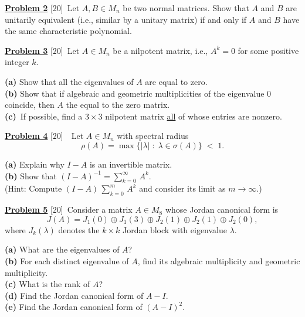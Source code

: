 \documentclass [11pt]{article}
\begin{document}
\newpage

\underline{\bf Problem 2} [20]\ 
 Let $A, B\in M_n$ be two normal matrices. Show that $A$ and $B$ are
 unitarily equivalent (i.e., similar by a unitary matrix) if and only if 
 $A$ and $B$ have the same characteristic polynomial.

\newpage

\underline{\bf Problem 3} [20]\
Let $A\in M_n$ be a nilpotent matrix, i.e., $A^k=0$ for some positive integer $k$.

{\bf (a)} Show that all the eigenvalues of $A$ are equal to zero.
\vspace{2.5in}\\
{\bf (b)} Show that if  algebraic and geometric multiplicities of the eigenvalue $0$ coincide, 
then $A$ the equal to the zero matrix.
\vspace{2.5in}\\
{\bf (c)}\ If possible, find a $3\times 3$ nilpotent matrix \underline{all} of whose entries are nonzero.


\newpage

\underline{\bf Problem 4} [20]\
\ Let $A\in M_n$ with spectral radius
$$\rho(A)=\max\{|\lambda|\;:\;\lambda\in\sigma(A)\}\;<\; 1.$$ 

{\bf (a)} Explain why $I-A$ is an invertible matrix.
\vspace{3in}\\
{\bf (b)} Show that $\displaystyle{(I-A)^{-1}=\sum_{k=0}^{\infty}\, A^k}$.\\
(Hint: Compute $\displaystyle{(I-A)\,\sum_{k=0}^{m}\, A^k}$ and consider
its limit as $m\rightarrow\infty$.)
 

\newpage

\underline{\bf Problem 5} [20]\
Consider a matrix $A\in M_8$ whose Jordan canonical form is 
$$J(A)=J_1(0)\oplus J_1(3)\oplus J_2(1)\oplus J_2(1)\oplus J_2(0),$$
where $J_k(\lambda)$ denotes the $k\times k$ Jordan block with eigenvalue $\lambda$.

{\bf (a)} What are the eigenvalues of $A$?
\vspace{.5in}\\
{\bf (b)} For each distinct eigenvalue of $A$, find its algebraic multiplicity and geometric multiplicity. 
\vspace{.75in}\\
{\bf (c)} What is the rank of $A$?
\vspace{.75in}\\
{\bf (d)} Find the Jordan canonical form of $A-I$.
\vspace{.75in}\\
{\bf (e)} Find the Jordan canonical form of $(A-I)^2$.
\end{document}
